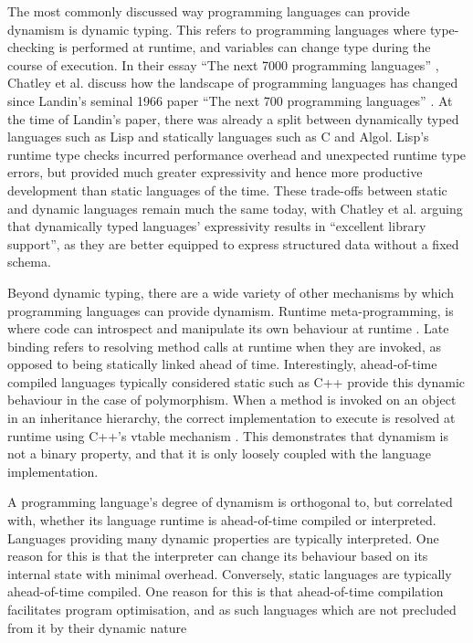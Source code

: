 The most commonly discussed way programming languages can provide dynamism is dynamic typing. This refers to programming languages where type-checking is performed at runtime, and variables can change type during the course of execution.
In their essay ``The next 7000 programming languages'' \cite{chatleyNext7000Programming2019}, Chatley et al. discuss how the landscape of programming languages has changed since Landin's seminal 1966 paper ``The next 700 programming languages'' \cite{landinNext700Programming1966}. At the time of Landin's paper, there was already a split between dynamically typed languages such as Lisp and statically languages such as C and Algol. Lisp's runtime type checks incurred performance overhead and unexpected runtime type errors, but provided much greater expressivity and hence more productive development than static languages of the time. These trade-offs between static and dynamic languages remain much the same today, with Chatley et al. arguing that dynamically typed languages' expressivity results in ``excellent library support'', as they are better equipped to express structured data without a fixed schema. %

Beyond dynamic typing, there are a wide variety of other mechanisms by which programming languages can provide dynamism.
Runtime meta-programming, is where code can introspect and manipulate its own behaviour at runtime \cite{}. %
Late binding refers to resolving method calls at runtime when they are invoked, as opposed to being statically linked ahead of time. Interestingly, ahead-of-time compiled languages typically considered static such as C++ provide this dynamic behaviour in the case of polymorphism. When a method is invoked on an object in an inheritance hierarchy, the correct implementation to execute is resolved at runtime using C++'s vtable mechanism \cite{}.
This demonstrates that dynamism is not a binary property, and that it is only loosely coupled with the language implementation.

A programming language's degree of dynamism is orthogonal to, but correlated with, whether its language runtime is ahead-of-time compiled or interpreted.
Languages providing many dynamic properties are typically interpreted. One reason for this is that the interpreter can change its behaviour based on its internal state with minimal overhead. Conversely, static languages are typically ahead-of-time compiled.
One reason for this is that ahead-of-time compilation facilitates program optimisation, and as such languages which are not precluded from it by their dynamic nature 

